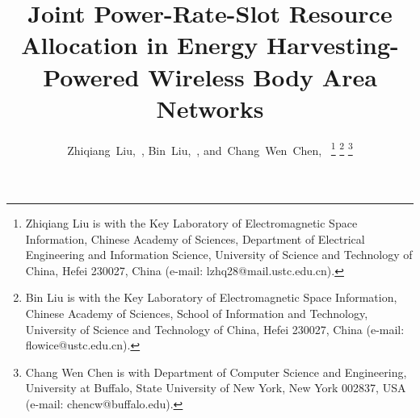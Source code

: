 \documentclass[journal,10pt]{IEEEtran}
\newcommand*{\TitleFont}{%
      \fontsize{22}{27.5}%
      \selectfont}
\begin{document}
\title{\TitleFont Joint Power-Rate-Slot Resource Allocation in Energy Harvesting-Powered Wireless Body Area Networks}
%
%
%

\author{Zhiqiang~Liu,~,
        Bin~Liu,~,
        and~Chang~Wen~Chen,~%
\thanks{Zhiqiang Liu is with the Key Laboratory of Electromagnetic Space Information, Chinese Academy of Sciences, Department of Electrical Engineering and Information Science, University of Science and Technology of China, Hefei 230027, China (e-mail: lzhq28@mail.ustc.edu.cn).}%
\thanks{Bin Liu is with the Key Laboratory of Electromagnetic Space Information, Chinese Academy of Sciences, School of Information and Technology, University of Science and Technology of China, Hefei 230027, China (e-mail: flowice@ustc.edu.cn).}
\thanks{Chang Wen Chen is with Department of Computer Science and Engineering, University at Buffalo, State University of New York, New York 002837, USA (e-mail: chencw@buffalo.edu).}}






\maketitle
 
\end{document}
